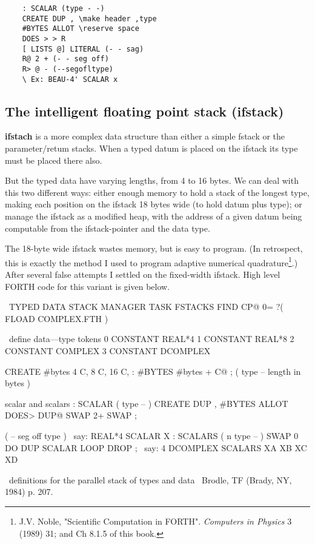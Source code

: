 \begin{lstlisting}
    : SCALAR (type - -)
    CREATE DUP , \make header ,type
    #BYTES ALLOT \reserve space
    DOES > > R
    [ LISTS @] LITERAL (- - sag)
    R@ 2 + (- - seg off)
    R> @ - (--segofltype)
    \ Ex: BEAU-4' SCALAR x
\end{lstlisting}

\subsection{The intelligent floating point stack (ifstack)}
 \textbf{ifstach} is a more complex data structure than either a simple fstack or the parameter/retum stacks. When a typed datum is placed on the ifstack its type must be placed there also.

But the typed data have varying lengths, from 4 to 16 bytes. We can deal with this two different ways: either  enough memory to hold a stack of the longest type, making each position on the ifstack 18 bytes wide (to hold datum plus type); or manage the ifstack as a modified heap, with the address of a given datum being computable from the ifstack-pointer and the data type.

The 18-byte wide ifstack wastes memory, but is easy to program. (In retrospect, this is exactly the method I used to program adaptive numerical quadrature\footnote{J.V. Noble, "Scientific Computation in FORTH". \textit{Computers in Physics} 3 (1989) 31; and Ch 8.1.5 of this book.}.) After several false attempts I settled on the fixed-width ifstack. High level FORTH code for this variant is given below.

    \ TYPED DATA STACK MANAGER
    TASK FSTACKS
    FIND CP@ 0=
    ?( FLOAD COMPLEX.FTH )

    \ define data—type tokens
    0 CONSTANT REAL*4
    1 CONSTANT REAL*8
    2 CONSTANT COMPLEX
    3 CONSTANT DCOMPLEX

    CREATE #bytes 4 C, 8 C, 16 C,
    : #BYTES #bytes + C@ ; 
    ( type -- length in bytes )

     scalar and scalars
    : SCALAR        ( type -- ) 
        CREATE DUP , #BYTES ALLOT 
        DOES> DUP@ SWAP 2+ SWAP ;

    ( -- seg off type )
    \ say: REAL*4 SCALAR X
    : SCALARS ( n type -- )
        SWAP 0 DO DUP SCALAR LOOP
        DROP ;
    \ say: 4 DCOMPLEX SCALARS XA XB XC XD

    \ definitions for the parallel stack of types and data 
    \ Brodle, TF (Brady, NY, 1984) p. 207.

